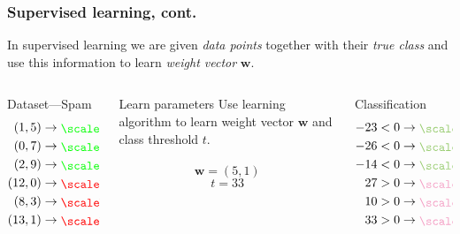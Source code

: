 \documentclass{beamer}
\newcommand*{\LargerCdot}{\raisebox{-0.25ex}{\scalebox{3.0}{$\cdot$}}}
\begin{document}
  \begin{frame}
    \frametitle{Supervised learning, cont.}
    In supervised learning we are given \emph{data points} together with their \emph{true class} and use this information to learn \emph{weight vector} $\mathbf{w}$.
    \begin{columns}
      \begin{column}{3cm}
        \begin{block}{Dataset---Spam}
          \begin{align*}
            (1,5)  & \rightarrow \textcolor{green}{\LargerCdot}\\
            (0,7)  & \rightarrow \textcolor{green}{\LargerCdot}\\
            (2,9)  & \rightarrow \textcolor{green}{\LargerCdot}\\
            (12,0) & \rightarrow \textcolor{red}{\LargerCdot}\\
            (8,3)  & \rightarrow \textcolor{red}{\LargerCdot}\\
            (13,1) & \rightarrow \textcolor{red}{\LargerCdot}
          \end{align*}
        \end{block}
      \end{column}
      \begin{column}{3cm}
        \begin{block}{Learn parameters}
          Use learning algorithm to learn weight vector $\mathbf{w}$ and class threshold $t$.\\
          ~\vspace*{.45cm}
          $$
            \mathbf{w} = (5,1)
          $$
          $$
            t = 33
          $$
        \end{block}
      \end{column}
      \begin{column}{3cm}
        \begin{block}{Classification}
          \begin{align*}
            -23 <0  & \rightarrow \textcolor{greenish}{\LargerCdot}\\
            -26  <0 & \rightarrow \textcolor{greenish}{\LargerCdot}\\
            -14  <0 & \rightarrow \textcolor{greenish}{\LargerCdot}\\
            27 >0 & \rightarrow \textcolor{redish}{\LargerCdot}\\
            10  >0 & \rightarrow \textcolor{redish}{\LargerCdot}\\
            33 >0 & \rightarrow \textcolor{redish}{\LargerCdot}
          \end{align*}
        \end{block}
      \end{column}
    \end{columns}
  \end{frame}
\end{document}
